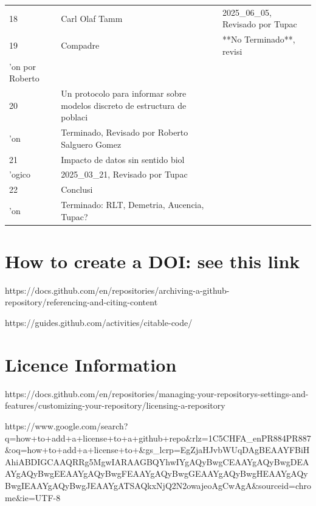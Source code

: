 \documentclass[
  12pt,
  letterpaper,
]{book}
\begin{document}
\begin{table}
\begin{tabular*}{\linewidth}{@{\extracolsep{\fill}}lll}
18 & Carl Olaf Tamm & 2025\_06\_05, Revisado por Tupac \\ 
19 & Compadre & **No Terminado**, revisi\\'on por Roberto \\ 
20 & Un protocolo para informar sobre modelos discreto de estructura de poblaci\\'on & Terminado, Revisado por Roberto Salguero Gomez \\ 
21 & Impacto de datos sin sentido biol\\'ogico & 2025\_03\_21, Revisado por Tupac \\ 
22 & Conclusi\\'on & Terminado: RLT, Demetria, Aucencia, Tupac? \\ 
\bottomrule
\end{tabular*}
\end{table}

\section{How to create a DOI: see this
link}\label{how-to-create-a-doi-see-this-link}

https://docs.github.com/en/repositories/archiving-a-github-repository/referencing-and-citing-content

https://guides.github.com/activities/citable-code/

\section{\texorpdfstring{\textbf{Licence
Information}}{Licence Information}}\label{licence-information}

https://docs.github.com/en/repositories/managing-your-repositorys-settings-and-features/customizing-your-repository/licensing-a-repository

https://www.google.com/search?q=how+to+add+a+license+to+a+github+repo\&rlz=1C5CHFA\_enPR884PR887\&oq=how+to+add+a+license+to+\&gs\_lcrp=EgZjaHJvbWUqDAgBEAAYFBiHAhiABDIGCAAQRRg5MgwIARAAGBQYhwIYgAQyBwgCEAAYgAQyBwgDEAAYgAQyBwgEEAAYgAQyBwgFEAAYgAQyBwgGEAAYgAQyBwgHEAAYgAQyBwgIEAAYgAQyBwgJEAAYgATSAQkxNjQ2N2owajeoAgCwAgA\&sourceid=chrome\&ie=UTF-8


\backmatter
\end{document}
